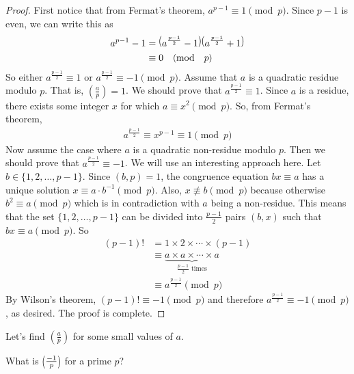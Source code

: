 \documentclass[main.tex]{subfile}
\begin{document}
	\begin{proof}
		First notice that from Fermat's theorem, $a^{p-1} \equiv 1 \pmod p$. Since $p-1$ is even, we can write this as
		\begin{align*}
			a^{p-1} - 1
				& = \parenthesis{a^{\frac{p-1}{2}} - 1}\parenthesis{a^{\frac{p-1}{2}} + 1}\\
				& \equiv 0 \pmod p
		\end{align*}
		So either $a^{\frac{p-1}{2}} \equiv 1$ or $a^{\frac{p-1}{2}} \equiv -1 \pmod p$.
		Assume that $a$ is a quadratic residue modulo $p$. That is, $ \left(\frac{a}{p}\right)=1$. We should prove that $a^{\frac{p-1}{2}} \equiv 1$. Since $a$ is a residue, there exists some integer $x$ for which $a \equiv x^2 \pmod p$. So, from Fermat's theorem,
		\begin{align*}
			a^{\frac{p-1}{2}} \equiv x^{p-1} \equiv 1 \pmod p
		\end{align*}
		Now assume the case where $a$ is a quadratic non-residue modulo $p$. Then we should prove that $a^{\frac{p-1}{2}} \equiv -1$. We will use an interesting approach here. Let $b \in \{1,2,\ldots,p-1\}$. Since $(b,p)=1$, the congruence equation $bx \equiv a$ has a unique solution $x \equiv a \cdot b^{-1} \pmod p$. Also, $x \not \equiv b \pmod p$ because otherwise $b^2 \equiv a \pmod p$ which is in contradiction with $a$ being a non-residue. This means that the set $\{1,2,\ldots,p-1\}$ can be divided into $\frac{p-1}{2}$ pairs $(b,x)$ such that $bx \equiv a \pmod p$. So
		\begin{align*}
			(p-1)!
				& = 1 \times 2 \times \cdots \times (p-1)\\
				& \equiv \underbrace{a \times a \times \cdots \times a}_{\frac{p-1}{2}\text{ times}}\\
				& \equiv a^{\frac{p-1}{2}} \pmod p
		\end{align*}
		By Wilson's theorem, $(p-1)! \equiv -1 \pmod p$ and therefore $a^{\frac{p-1}{2}} \equiv -1 \pmod p$, as desired. The proof is complete.
	\end{proof}
Let's find $\left(\frac{a}{p}\right)$ for some small values of $a$.
	\begin{problem}
		What is $\parenthesis{\frac{-1}{p}}$ for a prime $p$?
	\end{problem}
\end{document}
